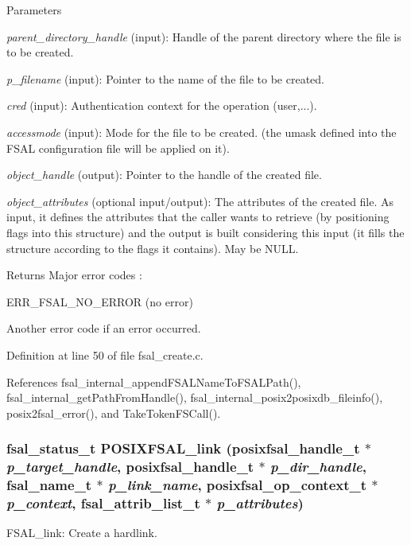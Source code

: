 \begin{DoxyParams}{Parameters}
\item[{\em parent\_\-directory\_\-handle}](input): Handle of the parent directory where the file is to be created. \item[{\em p\_\-filename}](input): Pointer to the name of the file to be created. \item[{\em cred}](input): Authentication context for the operation (user,...). \item[{\em accessmode}](input): Mode for the file to be created. (the umask defined into the FSAL configuration file will be applied on it). \item[{\em object\_\-handle}](output): Pointer to the handle of the created file. \item[{\em object\_\-attributes}](optional input/output): The attributes of the created file. As input, it defines the attributes that the caller wants to retrieve (by positioning flags into this structure) and the output is built considering this input (it fills the structure according to the flags it contains). May be NULL.\end{DoxyParams}
\begin{DoxyReturn}{Returns}
Major error codes :
\begin{DoxyItemize}
\item ERR\_\-FSAL\_\-NO\_\-ERROR (no error)
\item Another error code if an error occurred. 
\end{DoxyItemize}
\end{DoxyReturn}


Definition at line 50 of file fsal\_\-create.c.

References fsal\_\-internal\_\-appendFSALNameToFSALPath(), fsal\_\-internal\_\-getPathFromHandle(), fsal\_\-internal\_\-posix2posixdb\_\-fileinfo(), posix2fsal\_\-error(), and TakeTokenFSCall().
\subsubsection[{POSIXFSAL\_\-link}]{\setlength{\rightskip}{0pt plus 5cm}fsal\_\-status\_\-t POSIXFSAL\_\-link (posixfsal\_\-handle\_\-t $\ast$ {\em p\_\-target\_\-handle}, \/  posixfsal\_\-handle\_\-t $\ast$ {\em p\_\-dir\_\-handle}, \/  fsal\_\-name\_\-t $\ast$ {\em p\_\-link\_\-name}, \/  posixfsal\_\-op\_\-context\_\-t $\ast$ {\em p\_\-context}, \/  fsal\_\-attrib\_\-list\_\-t $\ast$ {\em p\_\-attributes})}\label{fsal__create_8c_a42d0265176f7bc19556bb231f371e569}
FSAL\_\-link: Create a hardlink.


